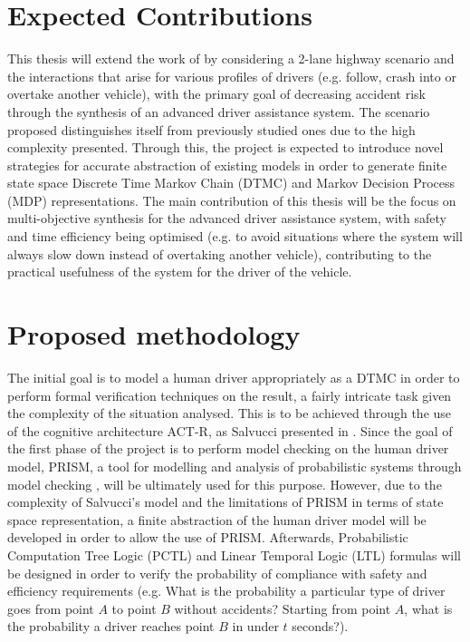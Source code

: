 \documentclass[a4paper]{article}
\begin{document}
\section{Expected Contributions}

This thesis will extend the work of \cite{fv4, jason, salvucci} by considering a 2-lane highway scenario and the interactions that arise for various profiles of drivers (e.g. follow, crash into or overtake another vehicle), with the primary goal of decreasing accident risk through the synthesis of an advanced driver assistance system. The scenario proposed distinguishes itself from previously studied ones due to the high complexity presented. Through this, the project is expected to introduce novel strategies for accurate abstraction of existing models in order to generate finite state space Discrete Time Markov Chain (DTMC) and Markov Decision Process (MDP) representations. The main contribution of this thesis will be the focus on multi-objective synthesis for the advanced driver assistance system, with safety and time efficiency being optimised (e.g. to avoid situations where the system will always slow down instead of overtaking another vehicle), contributing to the practical usefulness of the system for the driver of the vehicle.

\section{Proposed methodology}

The initial goal is to model a human driver appropriately as a DTMC in order to perform formal verification techniques on the result, a fairly intricate task given the complexity of the situation analysed. This is to be achieved through the use of the cognitive architecture ACT-R, as Salvucci presented in \cite{salvucci}. Since the goal of the first phase of the project is to perform model checking on the human driver model, PRISM, a tool for modelling and analysis of probabilistic systems through model checking \cite{prism}, will be ultimately used for this purpose. However, due to the complexity of Salvucci's model and the limitations of PRISM in terms of state space representation, a finite abstraction of the human driver model will be developed in order to allow the use of PRISM. Afterwards, Probabilistic Computation Tree Logic (PCTL) and Linear Temporal Logic (LTL) formulas will be designed in order to verify the probability of compliance with safety and efficiency requirements (e.g. What is the probability a particular type of driver goes from point $A$ to point $B$ without accidents? Starting from point $A$, what is the probability a driver reaches point $B$ in under $t$ seconds?).
\end{document}
